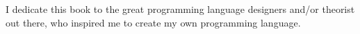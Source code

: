 I dedicate this book to the great programming language designers and/or theorist out there, who inspired me to create my own programming language.